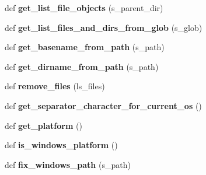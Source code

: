 \begin{DoxyCompactItemize}
\item 
def {\bfseries get\+\_\+list\+\_\+file\+\_\+objects} (s\+\_\+parent\+\_\+dir)\hypertarget{namespacenegui_1_1pgutilities_ad045331ad9e74cc1d8fdc2a8c2b050af}{}\label{namespacenegui_1_1pgutilities_ad045331ad9e74cc1d8fdc2a8c2b050af}

\item 
def {\bfseries get\+\_\+list\+\_\+files\+\_\+and\+\_\+dirs\+\_\+from\+\_\+glob} (s\+\_\+glob)\hypertarget{namespacenegui_1_1pgutilities_aa5d355d2c26bf4992ce682449dfb93fc}{}\label{namespacenegui_1_1pgutilities_aa5d355d2c26bf4992ce682449dfb93fc}

\item 
def {\bfseries get\+\_\+basename\+\_\+from\+\_\+path} (s\+\_\+path)\hypertarget{namespacenegui_1_1pgutilities_abbecfce3431917f0ed764bc056b04fdc}{}\label{namespacenegui_1_1pgutilities_abbecfce3431917f0ed764bc056b04fdc}

\item 
def {\bfseries get\+\_\+dirname\+\_\+from\+\_\+path} (s\+\_\+path)\hypertarget{namespacenegui_1_1pgutilities_ae147f21f478f594d3e696d9198fa999b}{}\label{namespacenegui_1_1pgutilities_ae147f21f478f594d3e696d9198fa999b}

\item 
def {\bfseries remove\+\_\+files} (ls\+\_\+files)\hypertarget{namespacenegui_1_1pgutilities_ab276fa71e3e15636a51644dcb4f395ba}{}\label{namespacenegui_1_1pgutilities_ab276fa71e3e15636a51644dcb4f395ba}

\item 
def {\bfseries get\+\_\+separator\+\_\+character\+\_\+for\+\_\+current\+\_\+os} ()\hypertarget{namespacenegui_1_1pgutilities_a58912c5a49fed034b7899bae2763ea42}{}\label{namespacenegui_1_1pgutilities_a58912c5a49fed034b7899bae2763ea42}

\item 
def {\bfseries get\+\_\+platform} ()\hypertarget{namespacenegui_1_1pgutilities_a2086b2e2c5a53778e69925e7c9cb4ce5}{}\label{namespacenegui_1_1pgutilities_a2086b2e2c5a53778e69925e7c9cb4ce5}

\item 
def {\bfseries is\+\_\+windows\+\_\+platform} ()\hypertarget{namespacenegui_1_1pgutilities_afc489aeb6d08669a944cea475609c3ab}{}\label{namespacenegui_1_1pgutilities_afc489aeb6d08669a944cea475609c3ab}

\item 
def {\bfseries fix\+\_\+windows\+\_\+path} (s\+\_\+path)\hypertarget{namespacenegui_1_1pgutilities_a84406a87eec039d98e307a1e716b033d}{}\label{namespacenegui_1_1pgutilities_a84406a87eec039d98e307a1e716b033d}


\end{DoxyCompactItemize}

